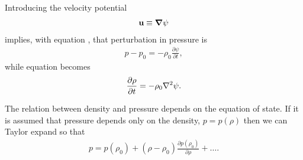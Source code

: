 Introducing the velocity potential
\begin{align}
 \textbf{u} \equiv \mbox{\boldmath $\nabla$} \psi
\end{align}
implies, with equation , that perturbation in pressure is
\begin{align}
p-p_0 = -\rho_0 \frac{\partial \psi}{\partial t},
\end{align}
while equation  becomes
\begin{align}
\frac{\partial \rho}{\partial t} = - \rho_0 \nabla^2 \psi.
\end{align}

The relation between density and pressure depends on the equation of state.  
If it is assumed that pressure depends only on the density, $p=p(\rho)$
then we can Taylor expand so that
\begin{align}
p = p(\rho_0) + (\rho-\rho_0) \frac{\partial p(\rho_0)}{\partial \rho} + \ldots.
\end{align}

